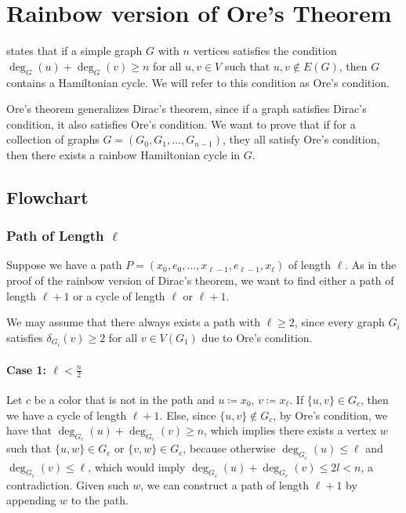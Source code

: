 
\chapter{Rainbow version of Ore's Theorem}

\cite{Ore_1960} states that if a simple graph $G$ with $n$ vertices satisfies the condition
$\deg_G(u) + \deg_G(v) \geq n$ for all $u, v \in V$ such that ${u, v} \not\in E(G)$, then $G$ contains a Hamiltonian cycle.
We will refer to this condition as Ore's condition.

Ore's theorem generalizes Dirac's theorem, since if a graph satisfies Dirac's condition, it also satisfies Ore's condition.
We want to prove that if for a collection of graphs $G = (G_0, G_1, \ldots, G_{n-1})$, they all satisfy Ore's condition,
then there exists a rainbow Hamiltonian cycle in $G$.

\section{Flowchart}

\subsection{Path of Length $\ell$}

Suppose we have a path $ P = (x_0, e_0, \dots, x_{\ell-1}, e_{\ell-1}, x_{\ell}) $ of length $ \ell $.
As in the proof of the rainbow version of Dirac's theorem,
we want to find either a path of length $ \ell+1 $ or a cycle of length $ \ell $ or $ \ell+1 $.

We may assume that there always exists a path with $ \ell \geq 2 $, since every graph 
$ G_i $ satisfies $ \delta_{G_i}(v) \geq 2 $ for all $ v \in V(G_1) $ due to Ore's condition.

\subsubsection{Case 1: \( \ell < \frac{n}{2} \)}

Let \( c \) be a color that is not in the path and \(u \coloneqq x_0\), \(v \coloneqq x_{\ell}\). 
If \( \{u, v\} \in G_c \), then we have a cycle of length \( \ell+1 \).
Else, since \( \{u, v\} \not\in G_c \), by Ore's condition, 
we have that \( \deg_{G_c}(u) + \deg_{G_c}(v) \geq n \), which implies there exists a 
vertex \( w \) such that \( \{u, w\} \in G_c \) or \( \{v, w\} \in G_c \), because otherwise
\( \deg_{G_c}(u) \leq \ell  \) and \( \deg_{G_c}(v) \leq \ell \), 
which would imply \( \deg_{G_c}(u) + \deg_{G_c}(v) \leq 2l < n \), a contradiction.
Given such \(w\), we can construct a path of length \( \ell+1 \) by appending \(w\) to the path.

